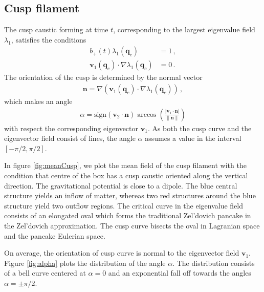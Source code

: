 \documentclass[a4paper, 11pt]{article}
\begin{document}
\subsection{Cusp filament}
The cusp caustic forming at time $t$, corresponding to the largest eigenvalue field $\lambda_1$, satisfies the conditions
\begin{align}
b_+(t) \lambda_1(\bm{q}_c) &= 1\,, \\
 \bm{v}_1(\bm{q}_c) \cdot \nabla\lambda_1(\bm{q}_c) &= 0\,.
\end{align}
The orientation of the cusp is determined by the normal vector
\begin{align}
\bm{n} =  \nabla(\bm{v}_1(\bm{q}_c) \cdot \nabla\lambda_1(\bm{q}_c))\,,
\end{align}
which makes an angle 
\begin{align}
\alpha = \text{sign}(\bm{v}_2\cdot \bm{n}) \arccos\left(\frac{|\bm{v}_1\cdot \bm{n}|}{\|\bm{n}\|}\right)
\end{align}
with respect the corresponding eigenvector $\bm{v}_1$. As both the cusp curve and the eigenvector field consist of lines, the angle $\alpha$ assumes a value in the interval $[-\pi/2,\pi/2]$. 

In figure \ref{fig:meanCusp}, we plot the mean field of the cusp filament with the condition that centre of the box has a cusp caustic oriented along the vertical direction. The gravitational potential is close to a dipole. The blue central structure yields an inflow of matter, whereas two red structures around the blue structure yield two outflow regions. The critical curve in the eigenvalue field consists of an elongated oval which forms the traditional Zel'dovich pancake in the Zel'dovich approximation. The cusp curve bisects the oval in Lagranian space and the pancake Eulerian space.

On average, the orientation of cusp curve is normal to the eigenvector field $\bm{v}_1$. Figure \ref{fig:alpha} plots the distribution  of the angle $\alpha$. The distribution consists of a bell curve centered at $\alpha =0$ and an exponential fall off towards the angles $\alpha =\pm \pi/2$.
\end{document}
